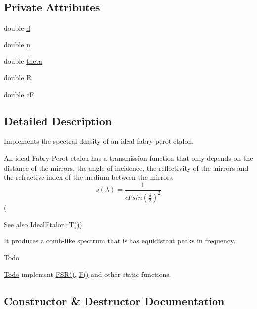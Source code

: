 \subsection*{Private Attributes}
\begin{DoxyCompactItemize}
\item 
double \hyperlink{class_ideal_etalon_a8f63e477f8637502ef97b2f45875f57a}{d}
\item 
double \hyperlink{class_ideal_etalon_a1b1004d0898c3a054ca9cf412813c9d5}{n}
\item 
double \hyperlink{class_ideal_etalon_adb01dc93fb40a0735b5ed00907ffe0fd}{theta}
\item 
double \hyperlink{class_ideal_etalon_ae545946e739c8079c0ced7f836180cd1}{R}
\item 
double \hyperlink{class_ideal_etalon_a93f909e0b51e64a057ac90985c5257fc}{cF}
\end{DoxyCompactItemize}


\subsection{Detailed Description}
Implements the spectral density of an ideal fabry-\/perot etalon. 

An ideal Fabry-\/\+Perot etalon has a transmission function that only depends on the distance of the mirrors, the angle of incidence, the reflectivity of the mirrors and the refractive index of the medium between the mirrors. \[ s(\lambda) = \frac{1}{cF sin(\frac{\delta} {2})^2} \] (\begin{DoxySeeAlso}{See also}
\hyperlink{class_ideal_etalon_a18df1a0ca15f7d71763713f867cf3532}{Ideal\+Etalon\+::\+T()})
\end{DoxySeeAlso}
It produces a comb-\/like spectrum that is has equidistant peaks in frequency.

\begin{DoxyRefDesc}{Todo}
\item[\hyperlink{todo__todo000001}{Todo}]implement \hyperlink{class_ideal_etalon_a07e0545a681973d6be2e51e14a8945ef}{F\+S\+R()}, \hyperlink{class_ideal_etalon_a4b5547956e9795be364365e4997050c7}{F()} and other static functions.\end{DoxyRefDesc}


\subsection{Constructor \& Destructor Documentation}
